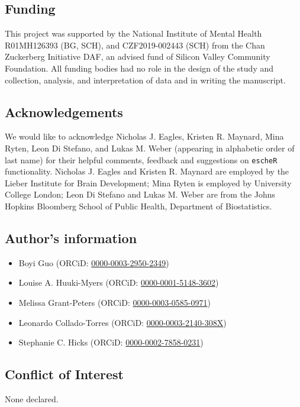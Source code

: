 \documentclass[10pt,twocolumn]{article}
\begin{document}
\subsection*{Funding}
This project was supported by the National Institute of Mental Health R01MH126393 (BG, SCH), and CZF2019-002443 (SCH) from the Chan Zuckerberg Initiative DAF, an advised fund of Silicon Valley Community Foundation. All funding bodies had no role in the design of the study and collection, analysis, and interpretation of data and in writing the manuscript.

\subsection*{Acknowledgements}
We would like to acknowledge Nicholas J. Eagles, Kristen R. Maynard, Mina Ryten, Leon Di Stefano, and Lukas M. Weber (appearing in alphabetic order of last name) for their helpful comments, feedback and suggestions on \texttt{escheR} functionality. Nicholas J. Eagles and Kristen R. Maynard are employed by the Lieber Institute for Brain Development; Mina Ryten is employed by University College London; Leon Di Stefano and Lukas M. Weber are from the Johns Hopkins Bloomberg School of Public Health, Department of Biostatistics. 


\subsection*{Author’s information}

\begin{itemize}[nosep]
    \item Boyi Guo (ORCiD: \href{https://orcid.org/0000-0003-2950-2349}{0000-0003-2950-2349})
    \item Louise A. Huuki-Myers (ORCiD: \href{https://orcid.org/0000-0001-5148-3602}{0000-0001-5148-3602})
    \item Melissa Grant-Peters (ORCiD: \href{https://orcid.org/0000-0003-0585-0971}{0000-0003-0585-0971})
    \item Leonardo Collado-Torres (ORCiD: \href{https://orcid.org/0000-0003-2140-308X}{0000-0003-2140-308X})
    \item Stephanie C. Hicks (ORCiD: \href{https://orcid.org/0000-0002-7858-0231}{0000-0002-7858-0231})
\end{itemize} 

\subsection*{Conflict of Interest} 
None declared.
\end{document}
